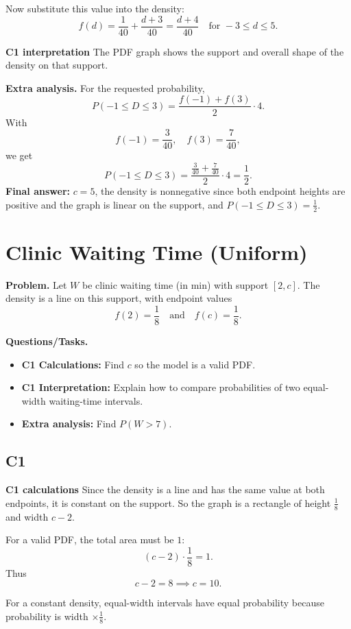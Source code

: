 	Now substitute this value into the density:
	\[
	f(d)=\frac{1}{40}+\frac{d+3}{40}=\frac{d+4}{40}\quad\text{for }-3\le d\le 5.
	\]
	
	\textbf{C1 interpretation}
	The PDF graph shows the support and overall shape of the density on that support.
	
	\textbf{Extra analysis.}
	For the requested probability,
	\[
	P(-1\le D\le3)=\frac{f(-1)+f(3)}{2}\cdot4.
	\]
	With
	\[
	f(-1)=\frac{3}{40},\quad f(3)=\frac{7}{40},
	\]
	we get
	\[
	P(-1\le D\le3)=\frac{\frac{3}{40}+\frac{7}{40}}{2}\cdot4=\frac12.
	\]
	\textbf{Final answer:} $c=5$, the density is nonnegative since both endpoint heights are positive and the graph is linear on the support, and $P(-1\le D\le3)=\frac12$.
	
	\section{Clinic Waiting Time (Uniform)}
	
	\textbf{Problem.}
	Let $W$ be clinic waiting time (in min) with support $[2,c]$. The density is a line on this support, with endpoint values
	\[
	f(2)=\frac18
	\quad\text{and}\quad
	f(c)=\frac18.
	\]
	
	\textbf{Questions/Tasks.}
	\begin{itemize}
		\item \textbf{C1 Calculations:} Find $c$ so the model is a valid PDF.
		\item \textbf{C1 Interpretation:} Explain how to compare probabilities of two equal-width waiting-time intervals.
		\item \textbf{Extra analysis:} Find $P(W>7)$.
	\end{itemize}
	
	\subsection*{C1}
	
	\textbf{C1 calculations}
	Since the density is a line and has the same value at both endpoints, it is constant on the support. So the graph is a rectangle of height $\frac18$ and width $c-2$.
	
	For a valid PDF, the total area must be $1$:
	\[
	(c-2)\cdot\frac18=1.
	\]
	Thus
	\[
	c-2=8\implies c=10.
	\]
	
	For a constant density, equal-width intervals have equal probability because probability is width $\times \frac18$.
	
